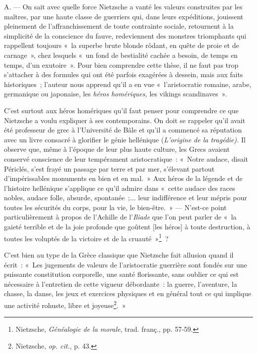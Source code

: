 \documentclass[french,twoside]{book} %
\begin{document}
\noindent A. — On sait avec quelle force Nietzsche a vanté les valeurs construites par les maîtres, par une haute classe de guerriers qui, dans leurs expéditions, jouissent pleinement de l’affranchissement de toute contrainte sociale, retournent à la simplicité de la conscience du fauve, redeviennent des monstres triomphants qui rappellent toujours « la superbe brute blonde rôdant, en quête de proie et de carnage », chez lesquels « un fond de bestialité cachée a besoin, de temps en temps, d’un exutoire ». Pour bien comprendre cette thèse, il ne faut pas trop s’attacher à des formules qui ont été parfois exagérées à dessein, mais aux faits historiques ; l’auteur nous apprend qu’il a en vue « l’aristocratie romaine, arabe, germanique ou japonaise, les \emph{héros homériques,} les vikings scandinaves ».\par
 C’est surtout aux héros homériques qu’il faut penser pour comprendre ce que Nietzsche a voulu expliquer à ses contemporains. On doit se rappeler qu’il avait été professeur de grec à l’Université de Bâle et qu’il a commencé sa réputation avec un livre consacré à glorifier le génie hellénique (\emph{L’origine de la tragédie).} Il observe que, même à l’époque de leur plus haute culture, les Grecs avaient conservé conscience de leur tempérament aristocratique : « Notre audace, disait Périclés, s’est frayé un passage par terre et par mer, s’élevant partout d’impérissables monuments en bien et en mal. » Aux héros de la légende et de l’histoire hellénique s’applique ce qu’il admire dans « cette audace des races nobles, audace folle, absurde, spontanée ;... leur indifférence et leur mépris pour toutes les sécurités du corps, pour la vie, le bien-être. » — N’est-ce point particulièrement à propos de l’Achille de l’\emph{Iliade} que l’on peut parler de « la gaieté terrible et de la joie profonde que goûtent [les héros] à toute destruction, à toutes les voluptés de la victoire et de la cruauté »\footnote{ \noindent Nietzsche, \emph{Généalogie de la morale}, trad. franç., pp. 57-59.
 } ?\par
C’est bien au type de la Grèce classique que Nietzsche fait allusion quand il écrit : « Les jugements de valeurs de l’aristocratie guerrière sont fondés sur une puissante constitution corporelle, une santé florissante, sans oublier ce qui est nécessaire à l’entretien de cette vigueur débordante : la guerre, l’aventure, la chasse, la danse, les jeux et exercices physiques et en général tout ce  qui implique une activité rohuste, libre et joyeuse\footnote{ \noindent Nietzsche, \emph{op. cit.}, p. 43.
 }. »\par
\end{document}
